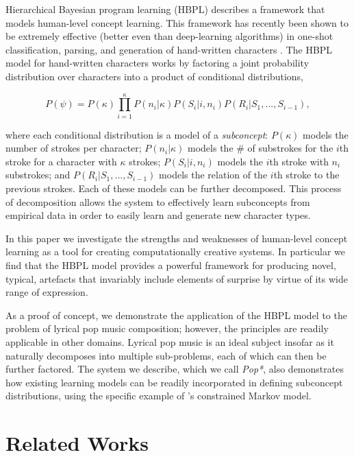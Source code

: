 \documentclass[letterpaper]{article}
\begin{document}
Hierarchical Bayesian program learning (HBPL) describes a framework that models human-level concept learning. This framework has recently been shown to be extremely effective (better even than deep-learning algorithms) in one-shot classification, parsing, and generation of hand-written characters \cite{lake2015human}. The HBPL model for hand-written characters works by factoring a joint probability distribution over characters into a product of conditional distributions,

\begin{equation} \label{eq:1}
P(\psi) = P(\kappa) \prod_{i=1}^{\kappa} P(n_i|\kappa)P(S_i|i,n_i)P(R_i|S_1, ..., S_{i-1}),
\end{equation}

\noindent where each conditional distribution is a model of a \textit{subconcept}: \( P(\kappa) \) models the number of strokes per character; \( P(n_i|\kappa) \) models the \# of substrokes for the $i$th stroke for a character with $\kappa$ strokes; \( P(S_i|i,n_i) \) models the $i$th stroke with $n_i$ substrokes; and \( P(R_i|S_1, ..., S_{i-1}) \) models the relation of the $i$th stroke to the previous strokes. Each of these models can be further decomposed. This process of decomposition allows the system to effectively learn subconcepts from empirical data in order to easily learn and generate new character types.

In this paper we investigate the strengths and weaknesses of human-level concept learning as a tool for creating computationally creative systems. In particular we find that the HBPL model provides a powerful framework for producing novel, typical, artefacts that invariably include elements of surprise by virtue of its wide range of expression.

As a proof of concept, we demonstrate the application of the HBPL model to the problem of lyrical pop music composition; however, the principles are readily applicable in other domains. Lyrical pop music is an ideal subject insofar as it naturally decomposes into multiple sub-problems, each of which can then be further factored. The system we describe, which we call \textit{Pop*}, also demonstrates how existing learning models can be readily incorporated in defining subconcept distributions, using the specific example of \cite{pachet2001finite}'s constrained Markov model.

\section{Related Works}
\end{document}
